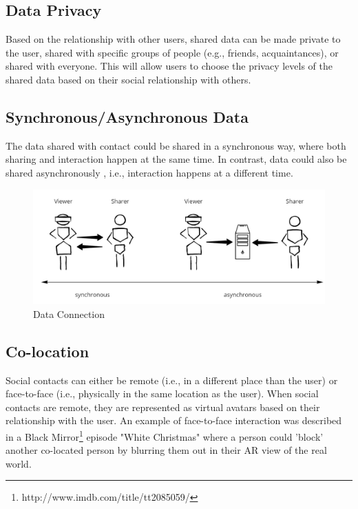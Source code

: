 \subsection{Data Privacy}
Based on the relationship with other users, shared data can be made private to the user, shared with specific groups of people (e.g., friends, acquaintances), or shared with everyone. This will allow users to choose the privacy levels of the shared data based on their social relationship with others. 

\subsection{Synchronous/Asynchronous Data}

The data shared with contact could be shared in a synchronous way, where both sharing and interaction happen at the same time. In contrast, data could also be shared asynchronously \cite{Smith2016}, i.e., interaction happens at a different time. 

\begin{figure}[h]
    \centering
    \includegraphics[width=.8\linewidth]{images/continuum-connection.jpg}
    \caption{Data Connection}
    \label{fig:continuum:data-connection}
\end{figure}

\subsection{Co-location}

Social contacts can either be remote (i.e., in a different place than the user) or face-to-face (i.e., physically in the same location as the user). When social contacts are remote, they are represented as virtual avatars based on their relationship with the user. An example of face-to-face interaction was described in a Black Mirror\footnote{http://www.imdb.com/title/tt2085059/} episode "White Christmas" where a person could 'block' another co-located person by blurring them out in their AR view of the real world.

